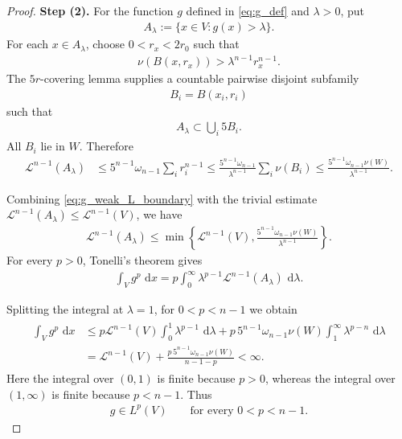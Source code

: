\documentclass[11pt]{amsart}
\theoremstyle{plain}
\theoremstyle{plain}
\theoremstyle{plain}
\newcommand{\dd}{\,\mathrm{d}}
\numberwithin{equation}{section}
\begin{document}
\begin{proof}
\textbf{Step (2).}
For the function \(g\) defined in \eqref{eq:g_def} and
\(\lambda>0\), put
\begin{align}
A_\lambda:=\{x\in V:g(x)>\lambda\}.\nonumber
\end{align}
For each \(x\in A_\lambda\), choose \(0<r_x<2r_0\) such that
\begin{align}
\nu(B(x,r_x))>\lambda^{n-1} r_x^{n-1}.\nonumber
\end{align}
The \(5r\)-covering lemma supplies a countable pairwise disjoint
subfamily
\begin{align}
B_i=B(x_i,r_i)\nonumber
\end{align}
such that
\begin{align}
A_\lambda\subset\bigcup_i5B_i.\nonumber
\end{align}
All \(B_i\) lie in \(W\).  Therefore
\begin{align}
\mathcal L^{n-1}(A_\lambda)
&\leq
5^{n-1}\omega_{n-1}\sum_i r_i^{n-1}\leq
\frac{5^{n-1}\omega_{n-1}}{\lambda^{n-1}}
\sum_i\nu(B_i)\leq
\frac{5^{n-1}\omega_{n-1}\nu(W)}{\lambda^{n-1}}.
\label{eq:g_weak_L_boundary}
\end{align}


Combining \eqref{eq:g_weak_L_boundary} with the trivial estimate
\(\mathcal L^{n-1}(A_\lambda)\leq\mathcal L^{n-1}(V)\), we have
\begin{align}
\mathcal L^{n-1}(A_\lambda)
\leq
\min\left\{
\mathcal L^{n-1}(V),
\frac{5^{n-1}\omega_{n-1}\nu(W)}
{\lambda^{n-1}}
\right\}.
\nonumber
\end{align}
For every \(p>0\), Tonelli's theorem gives
\begin{align}
\int_Vg^p\,\dd x
=
p\int_0^\infty
\lambda^{p-1}\mathcal L^{n-1}(A_\lambda)\,\dd\lambda.
\nonumber
\end{align}

Splitting the integral at \(\lambda=1\), for \(0<p<n-1\) we obtain
\begin{align}
\begin{aligned}
\int_Vg^p\,\dd x
&\leq
p\mathcal L^{n-1}(V)
\int_0^1\lambda^{p-1}\,\dd\lambda+
p\,5^{n-1}\omega_{n-1}\nu(W)
\int_1^\infty\lambda^{p-n}\,\dd\lambda\\
&=
\mathcal L^{n-1}(V)
+
\frac{
p\,5^{n-1}\omega_{n-1}\nu(W)
}{
n-1-p
}
<\infty.
\end{aligned}
\nonumber
\end{align}
Here the integral over \((0,1)\) is finite because \(p>0\), whereas
the integral over \((1,\infty)\) is finite because \(p<n-1\).
Thus
\begin{align}
g\in L^p(V)
\qquad
\text{for every }0<p<n-1.
\label{eq:g_Lp}
\end{align}


\end{proof}
\end{document}
